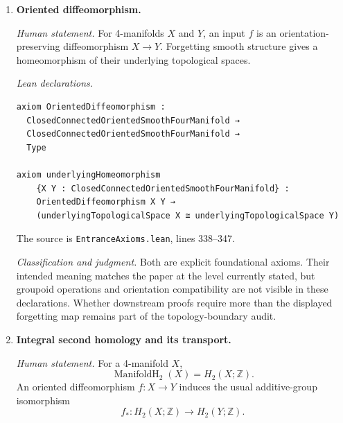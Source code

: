 \begin{enumerate}[label=\textbf{I\arabic*.},leftmargin=*]
\emph{Lean declarations.}
\begin{verbatim}
axiom ClosedConnectedOrientedSmoothFourManifold : Type

axiom underlyingTopologicalSpace :
  ClosedConnectedOrientedSmoothFourManifold → TopCat
\end{verbatim}
They occur in \texttt{EntranceAxioms.lean}, lines 332--336, under
\nolinkurl{lean/TwistedYetter/Kirby/Final/Semantics/Independent}.

\emph{Classification and judgment.}
These are explicit foundational vocabulary axioms; Lean does not construct
smooth 4-manifolds from more primitive objects.  Connectedness is now part
of the primitive type's stated meaning and name, rather than being inferred
indirectly from a later presentation-existence axiom.  This exactly matches
the manifold scope of the paper.  Status: \texttt{MATCH}.

\item \textbf{Oriented diffeomorphism.}

\emph{Human statement.}
For 4-manifolds $X$ and $Y$, an input $f$ is an orientation-preserving
diffeomorphism $X\to Y$.  Forgetting smooth structure gives a homeomorphism of
their underlying topological spaces.

\emph{Lean declarations.}
\begin{verbatim}
axiom OrientedDiffeomorphism :
  ClosedConnectedOrientedSmoothFourManifold →
  ClosedConnectedOrientedSmoothFourManifold →
  Type

axiom underlyingHomeomorphism
    {X Y : ClosedConnectedOrientedSmoothFourManifold} :
    OrientedDiffeomorphism X Y →
    (underlyingTopologicalSpace X ≅ underlyingTopologicalSpace Y)
\end{verbatim}
The source is \nolinkurl{EntranceAxioms.lean}, lines 338--347.

\emph{Classification and judgment.}
Both are explicit foundational axioms.  Their intended meaning matches the
paper at the level currently stated, but groupoid operations and orientation
compatibility are not visible in these declarations.  Whether downstream
proofs require more than the displayed forgetting map remains part of the
topology-boundary audit.

\item \textbf{Integral second homology and its transport.}

\emph{Human statement.}
For a 4-manifold $X$,
\[
  \operatorname{ManifoldH}_2(X)=H_2(X;\mathbb Z).
\]
An oriented diffeomorphism $f\colon X\to Y$ induces the usual
additive-group isomorphism
\[
  f_*\colon H_2(X;\mathbb Z)\longrightarrow H_2(Y;\mathbb Z).
\]


\end{enumerate}
